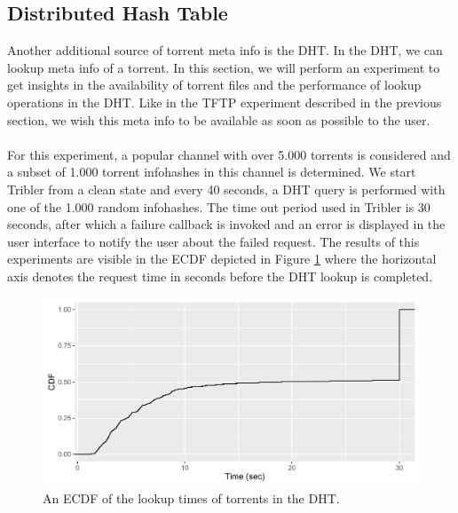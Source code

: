 \subsection{Distributed Hash Table}
\label{subsec:dht-experiment}
Another additional source of torrent meta info is the DHT. In the DHT, we can lookup meta info of a torrent. In this section, we will perform an experiment to get insights in the availability of torrent files and the performance of lookup operations in the DHT. Like in the TFTP experiment described in the previous section, we wish this meta info to be available as soon as possible to the user.\\\\
For this experiment, a popular channel with over 5.000 torrents is considered and a subset of 1.000 torrent infohashes in this channel is determined. We start Tribler from a clean state and every 40 seconds, a DHT query is performed with one of the 1.000 random infohashes. The time out period used in Tribler is 30 seconds, after which a failure callback is invoked and an error is displayed in the user interface to notify the user about the failed request. The results of this experiments are visible in the ECDF depicted in Figure \ref{fig:metainfo_fetch} where the horizontal axis denotes the request time in seconds before the DHT lookup is completed.\\

\begin{figure}[!h]
	\centering
	\includegraphics[width=1.0\columnwidth]{images/experiments/metainfo_fetch}
	\caption{An ECDF of the lookup times of torrents in the DHT.}
	\label{fig:metainfo_fetch}
\end{figure}

